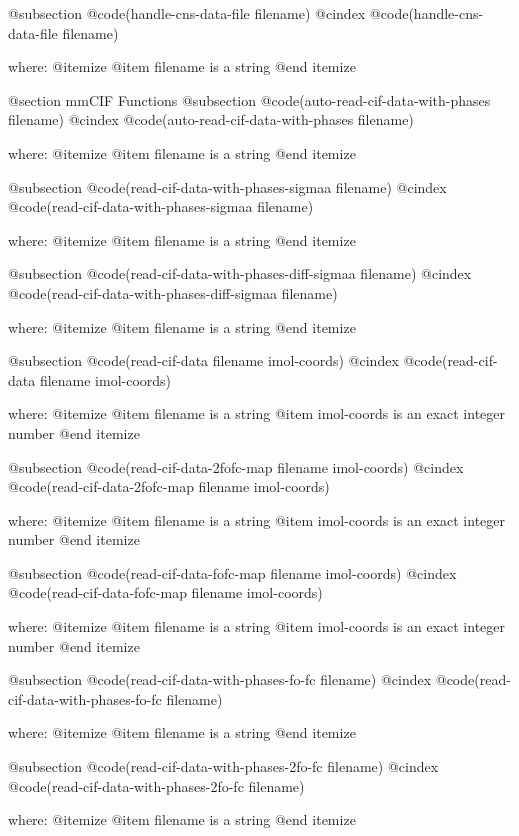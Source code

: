 @subsection @code{(handle-cns-data-file filename)}
@cindex @code{(handle-cns-data-file filename)}
 
where: 
 @itemize 
     @item filename is a string
 @end itemize



@section mmCIF Functions 
@subsection @code{(auto-read-cif-data-with-phases filename)}
@cindex @code{(auto-read-cif-data-with-phases filename)}
 
where: 
 @itemize 
     @item filename is a string
 @end itemize


@subsection @code{(read-cif-data-with-phases-sigmaa filename)}
@cindex @code{(read-cif-data-with-phases-sigmaa filename)}
 
where: 
 @itemize 
     @item filename is a string
 @end itemize


@subsection @code{(read-cif-data-with-phases-diff-sigmaa filename)}
@cindex @code{(read-cif-data-with-phases-diff-sigmaa filename)}
 
where: 
 @itemize 
     @item filename is a string
 @end itemize


@subsection @code{(read-cif-data filename imol-coords)}
@cindex @code{(read-cif-data filename imol-coords)}
 
where: 
 @itemize 
     @item filename is a string
     @item imol-coords is an exact integer number
 @end itemize


@subsection @code{(read-cif-data-2fofc-map filename imol-coords)}
@cindex @code{(read-cif-data-2fofc-map filename imol-coords)}
 
where: 
 @itemize 
     @item filename is a string
     @item imol-coords is an exact integer number
 @end itemize


@subsection @code{(read-cif-data-fofc-map filename imol-coords)}
@cindex @code{(read-cif-data-fofc-map filename imol-coords)}
 
where: 
 @itemize 
     @item filename is a string
     @item imol-coords is an exact integer number
 @end itemize


@subsection @code{(read-cif-data-with-phases-fo-fc filename)}
@cindex @code{(read-cif-data-with-phases-fo-fc filename)}
 
where: 
 @itemize 
     @item filename is a string
 @end itemize


@subsection @code{(read-cif-data-with-phases-2fo-fc filename)}
@cindex @code{(read-cif-data-with-phases-2fo-fc filename)}
 
where: 
 @itemize 
     @item filename is a string
 @end itemize


